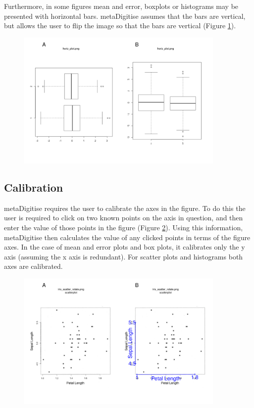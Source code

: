 \documentclass{article}
\begin{document}
Furthermore, in some figures mean and error, boxplots or histograms may be presented with horizontal bars. metaDigitise assumes that the bars are vertical, but allows the user to flip the image so that the bars are vertical (Figure \ref{fig:flip}).

\begin{figure}[!h] 
 \includegraphics[width=0.9\textwidth]{fig_flip.pdf} 
 \caption{ }
\label{fig:flip}
\end{figure}

\subsection{Calibration}
metaDigitise requires the user to calibrate the axes in the figure. To do this the user is required to click on two known points on the axis in question, and then enter the value of those points in the figure (Figure \ref{fig:calibrate}). Using this information, metaDigitise then calculates the value of any clicked points in terms of the figure axes. In the case of mean and error plots and box plots, it calibrates only the y axis (assuming the x axis is redundant). For scatter plots and histograms both axes are calibrated.


\begin{figure}[!h] 
 \includegraphics[width=0.9\textwidth]{fig_calibrate.pdf} 
 \caption{ }
\label{fig:calibrate}
\end{figure}
\end{document}
